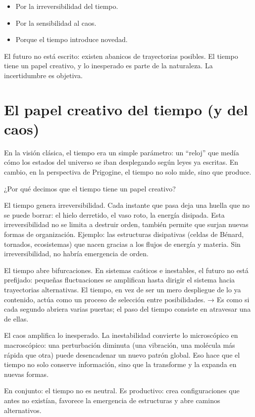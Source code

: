 \documentclass[
  10pt,
  a4paper,
  DIV=11,
  numbers=noendperiod,
  open=any]{scrreprt}
\numberwithin{equation}{chapter}
\numberwithin{equation}{section}
\renewcommand{\[}{\begin{equation}}
\renewcommand{\]}{\end{equation}}
\begin{document}
\begin{itemize}
\item
  Por la irreversibilidad del tiempo.
\item
  Por la sensibilidad al caos.
\item
  Porque el tiempo introduce novedad.
\end{itemize}

El futuro no está escrito: existen abanicos de trayectorias posibles. El
tiempo tiene un papel creativo, y lo inesperado es parte de la
naturaleza. La incertidumbre es objetiva.

\chapter{El papel creativo del tiempo (y del
caos)}\label{el-papel-creativo-del-tiempo-y-del-caos}

En la visión clásica, el tiempo era un simple parámetro: un ``reloj''
que medía cómo los estados del universo se iban desplegando según leyes
ya escritas. En cambio, en la perspectiva de Prigogine, el tiempo no
solo mide, sino que produce.

¿Por qué decimos que el tiempo tiene un papel creativo?

El tiempo genera irreversibilidad. Cada instante que pasa deja una
huella que no se puede borrar: el hielo derretido, el vaso roto, la
energía disipada. Esta irreversibilidad no se limita a destruir orden,
también permite que surjan nuevas formas de organización. Ejemplo: las
estructuras disipativas (celdas de Bénard, tornados, ecosistemas) que
nacen gracias a los flujos de energía y materia. Sin irreversibilidad,
no habría emergencia de orden.

El tiempo abre bifurcaciones. En sistemas caóticos e inestables, el
futuro no está prefijado: pequeñas fluctuaciones se amplifican hasta
dirigir el sistema hacia trayectorias alternativas. El tiempo, en vez de
ser un mero despliegue de lo ya contenido, actúa como un proceso de
selección entre posibilidades. → Es como si cada segundo abriera varias
puertas; el paso del tiempo consiste en atravesar una de ellas.

El caos amplifica lo inesperado. La inestabilidad convierte lo
microscópico en macroscópico: una perturbación diminuta (una vibración,
una molécula más rápida que otra) puede desencadenar un nuevo patrón
global. Eso hace que el tiempo no solo conserve información, sino que la
transforme y la expanda en nuevas formas.

En conjunto: el tiempo no es neutral. Es productivo: crea
configuraciones que antes no existían, favorece la emergencia de
estructuras y abre caminos alternativos.
\end{document}
